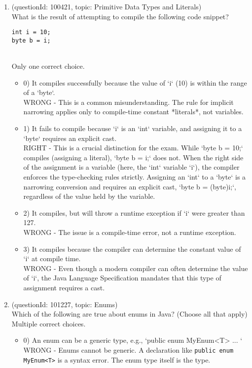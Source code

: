 \documentclass[12pt]{article}
\begin{document}
\begin{enumerate}[label=(\arabic*)]
\begin{itemize}
\end{itemize}
\item (questionId: 100421, topic: Primitive Data Types and Literals) \\ 
What is the result of attempting to compile the following code snippet?
\begin{verbatim}
int i = 10;
byte b = i;
\end{verbatim}
\\ \noindent Only one correct choice. 
\begin{itemize}
\item 0) It compiles successfully because the value of `i` (10) is within the range of a `byte`.
 \\ 
WRONG - This is a common misunderstanding. The rule for implicit narrowing applies only to compile-time constant *literals*, not variables.

\item 1) It fails to compile because `i` is an `int` variable, and assigning it to a `byte` requires an explicit cast.
 \\ 
RIGHT - This is a crucial distinction for the exam. While `byte b = 10;` compiles (assigning a literal), `byte b = i;` does not. When the right side of the assignment is a variable (here, the `int` variable `i`), the compiler enforces the type-checking rules strictly. Assigning an `int` to a `byte` is a narrowing conversion and requires an explicit cast, `byte b = (byte)i;`, regardless of the value held by the variable.

\item 2) It compiles, but will throw a runtime exception if `i` were greater than 127.
 \\ 
WRONG - The issue is a compile-time error, not a runtime exception.

\item 3) It compiles because the compiler can determine the constant value of `i` at compile time.
 \\ 
WRONG - Even though a modern compiler can often determine the value of `i`, the Java Language Specification mandates that this type of assignment requires a cast.

\end{itemize}
\item (questionId: 101227, topic: Enums) \\ 
Which of the following are true about enums in Java? (Choose all that apply)
\\ \noindent Multiple correct choices. 
\begin{itemize}
\item 0) An enum can be a generic type, e.g., `public enum MyEnum<T> { ... }`
 \\ 
WRONG - Enums cannot be generic. A declaration like \verb|public enum MyEnum<T>| is a syntax error. The enum type itself is the type.


\end{itemize}
\end{enumerate}
\end{document}
